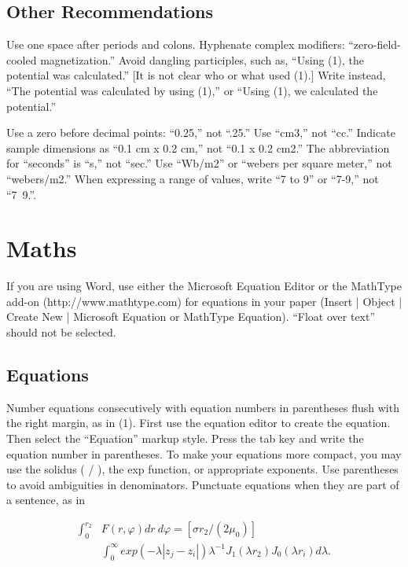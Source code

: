 \documentclass[journal]{IEEEtranTIE}
\begin{document}
\subsection{Other Recommendations}
Use one space after periods and colons. Hyphenate complex modifiers: ``zero-field-cooled magnetization.'' Avoid dangling participles, such as, ``Using (1), the potential was calculated.'' [It is not clear who or what used (1).] Write instead, ``The potential was calculated by using (1),'' or ``Using (1), we calculated the potential.''

Use a zero before decimal points: ``0.25,'' not ``.25.'' Use ``cm3,'' not ``cc.'' Indicate sample dimensions as ``0.1 cm x 0.2 cm,'' not ``0.1 x 0.2 cm2.'' The abbreviation for ``seconds'' is ``s,'' not ``sec.'' Use ``Wb/m2'' or ``webers per square meter,'' not ``webers/m2.'' When expressing a range of values, write ``7 to 9'' or ``7-9,'' not ``7~9.''.

\section{Maths}

If you are using Word, use either the Microsoft Equation Editor or the MathType add-on (http://www.mathtype.com) for equations in your paper (Insert | Object | Create New | Microsoft Equation or MathType Equation). ``Float over text'' should not be selected.

\subsection{Equations}
Number equations consecutively with equation numbers in parentheses flush with the right margin, as in (1). First use the equation editor to create the equation. Then select the ``Equation'' markup style. Press the tab key and write the equation number in parentheses. To make your equations more compact, you may use the solidus ( / ), the exp function, or appropriate exponents. Use parentheses to avoid ambiguities in denominators. Punctuate equations when they are part of a sentence, as in	


\begin{align}
\nonumber\mathbf \int_{0}^{{r}_2} & F(r,\varphi) dr \ d\varphi = [\sigma{r}_2 / (2{\mu}_0)]
\\
& \int_{0}^{\infty} exp(-\lambda|{z}_j - {z}_i|){\lambda}^{-1} {J}_1 (\lambda {r}_2) {J}_0 (\lambda {r}_i) d \lambda .
\end{align}
\end{document}
